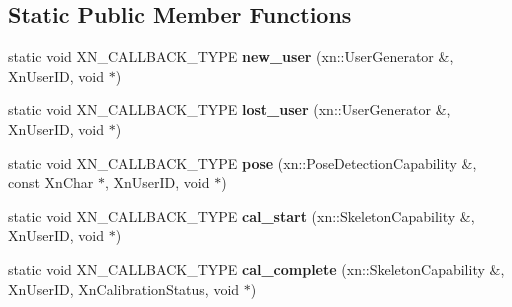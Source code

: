 \subsection*{Static Public Member Functions}
\begin{DoxyCompactItemize}
\item 
\hypertarget{class_tiem_spelchk_1_1_lurn2_spiel_nub_a38db742a870fe48644f795c3e249d6ab}{static void X\-N\-\_\-\-C\-A\-L\-L\-B\-A\-C\-K\-\_\-\-T\-Y\-P\-E {\bfseries new\-\_\-user} (xn\-::\-User\-Generator \&, Xn\-User\-I\-D, void $\ast$)}\label{class_tiem_spelchk_1_1_lurn2_spiel_nub_a38db742a870fe48644f795c3e249d6ab}

\item 
\hypertarget{class_tiem_spelchk_1_1_lurn2_spiel_nub_a9d85ee4de4621c0de0c7133fb15bcaa6}{static void X\-N\-\_\-\-C\-A\-L\-L\-B\-A\-C\-K\-\_\-\-T\-Y\-P\-E {\bfseries lost\-\_\-user} (xn\-::\-User\-Generator \&, Xn\-User\-I\-D, void $\ast$)}\label{class_tiem_spelchk_1_1_lurn2_spiel_nub_a9d85ee4de4621c0de0c7133fb15bcaa6}

\item 
\hypertarget{class_tiem_spelchk_1_1_lurn2_spiel_nub_a9e8df7c3c86b521fd642e6bd1719b1ad}{static void X\-N\-\_\-\-C\-A\-L\-L\-B\-A\-C\-K\-\_\-\-T\-Y\-P\-E {\bfseries pose} (xn\-::\-Pose\-Detection\-Capability \&, const Xn\-Char $\ast$, Xn\-User\-I\-D, void $\ast$)}\label{class_tiem_spelchk_1_1_lurn2_spiel_nub_a9e8df7c3c86b521fd642e6bd1719b1ad}

\item 
\hypertarget{class_tiem_spelchk_1_1_lurn2_spiel_nub_aeb00f8d55630f3f7d2da36d04302a174}{static void X\-N\-\_\-\-C\-A\-L\-L\-B\-A\-C\-K\-\_\-\-T\-Y\-P\-E {\bfseries cal\-\_\-start} (xn\-::\-Skeleton\-Capability \&, Xn\-User\-I\-D, void $\ast$)}\label{class_tiem_spelchk_1_1_lurn2_spiel_nub_aeb00f8d55630f3f7d2da36d04302a174}

\item 
\hypertarget{class_tiem_spelchk_1_1_lurn2_spiel_nub_a41dd33b54013b3974119d7a0da893d8a}{static void X\-N\-\_\-\-C\-A\-L\-L\-B\-A\-C\-K\-\_\-\-T\-Y\-P\-E {\bfseries cal\-\_\-complete} (xn\-::\-Skeleton\-Capability \&, Xn\-User\-I\-D, Xn\-Calibration\-Status, void $\ast$)}\label{class_tiem_spelchk_1_1_lurn2_spiel_nub_a41dd33b54013b3974119d7a0da893d8a}

\end{DoxyCompactItemize}
